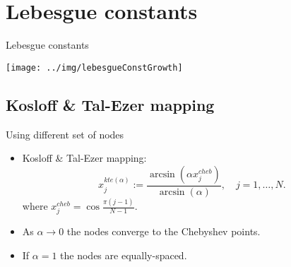 \documentclass{beamer}
\begin{document}
\section{Lebesgue constants}

\begin{frame}{Lebesgue constants}
  \begin{center}
    \texttt{[image: ../img/lebesgueConstGrowth]}
  \end{center}
\end{frame}

\subsection{Kosloff \& Tal-Ezer mapping}
\begin{frame}{Using different set of nodes}
  \begin{itemize}
    \item Kosloff \& Tal-Ezer mapping:
      \begin{equation*}
        x_j^{kte(\alpha)} := \frac{\arcsin(\alpha x_j^{cheb})}{\arcsin(\alpha)},
	\quad j = 1,\ldots,N.
      \end{equation*}
      where $x_j^{cheb} = \cos{\frac{\pi(j-1)}{N-1}}$.

    \item As $\alpha \rightarrow 0$ the nodes converge to the Chebyshev points.

    \item If $\alpha = 1$ the nodes are equally-spaced.
  \end{itemize}
\end{frame}
\end{document}
